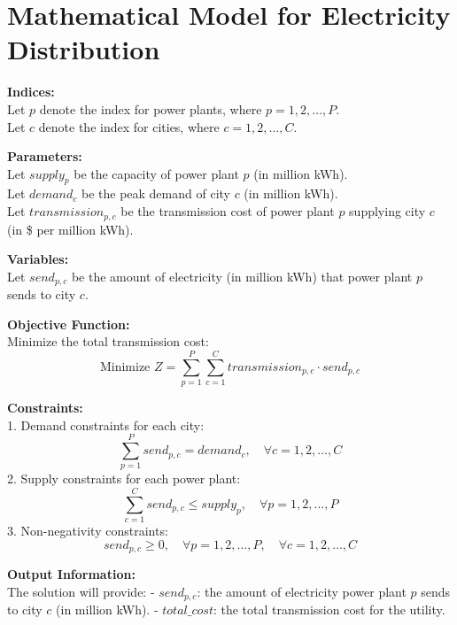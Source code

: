 \documentclass{article}
\begin{document}
\section*{Mathematical Model for Electricity Distribution}

\textbf{Indices:} \\
Let \( p \) denote the index for power plants, where \( p = 1, 2, \ldots, P \). \\
Let \( c \) denote the index for cities, where \( c = 1, 2, \ldots, C \).

\textbf{Parameters:} \\
Let \( supply_{p} \) be the capacity of power plant \( p \) (in million kWh). \\
Let \( demand_{c} \) be the peak demand of city \( c \) (in million kWh). \\
Let \( transmission_{p,c} \) be the transmission cost of power plant \( p \) supplying city \( c \) (in \$ per million kWh).

\textbf{Variables:} \\
Let \( send_{p,c} \) be the amount of electricity (in million kWh) that power plant \( p \) sends to city \( c \).

\textbf{Objective Function:} \\
Minimize the total transmission cost:
\[
\text{Minimize } Z = \sum_{p=1}^{P} \sum_{c=1}^{C} transmission_{p,c} \cdot send_{p,c}
\]

\textbf{Constraints:} \\
1. Demand constraints for each city:
\[
\sum_{p=1}^{P} send_{p,c} = demand_{c}, \quad \forall c = 1, 2, \ldots, C
\]
2. Supply constraints for each power plant:
\[
\sum_{c=1}^{C} send_{p,c} \leq supply_{p}, \quad \forall p = 1, 2, \ldots, P
\]
3. Non-negativity constraints:
\[
send_{p,c} \geq 0, \quad \forall p = 1, 2, \ldots, P, \quad \forall c = 1, 2, \ldots, C
\]

\textbf{Output Information:} \\
The solution will provide:
- \( send_{p,c} \): the amount of electricity power plant \( p \) sends to city \( c \) (in million kWh).
- \( total\_cost \): the total transmission cost for the utility.
\end{document}
